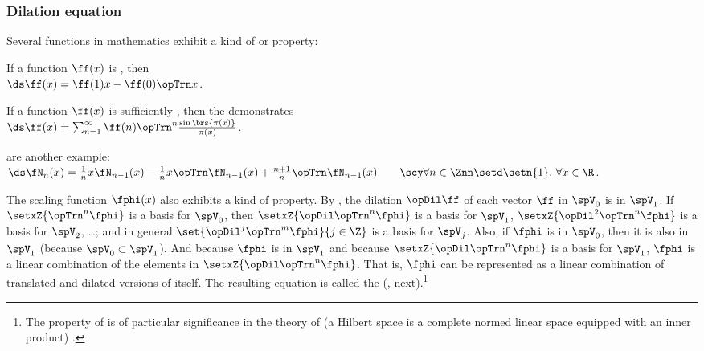 \subsubsection{Dilation equation}
Several functions in mathematics exhibit a kind of  or  property:
\begin{listi}
  \item If a function $\ff(x)$ is , then 
        \\\indentx$\ds\ff(x) = \ff(1)x - \ff(0)\opTrn x$.   %
  \item If a function $\ff(x)$ is sufficiently , then the   demonstrates
        \\\indentx$\ds\ff(x) = \sum_{n=1}^\infty \ff(n) \opTrn^n\frac{\sin\brs{\pi(x)}}{\pi(x)}$.
  \item {}  are another example:
        \\\indentx$\ds\fN_n(x)   = \frac{1}{n}x\fN_{n-1}(x) - \frac{1}{n}x\opTrn\fN_{n-1}(x) + \frac{n+1}{n}\opTrn\fN_{n-1}(x)  \qquad\scy\forall n\in\Znn\setd\setn{1},\,  \forall x\in\R$.
\end{listi}

The scaling function $\fphi(x)$  also exhibits a kind of  property.
By , the dilation $\opDil\ff$ of each vector $\ff$ in $\spV_0$ is in $\spV_1$.
If $\setxZ{\opTrn^n\fphi}$ is a basis for $\spV_0$,
then $\setxZ{\opDil\opTrn^n\fphi}$ is a basis for $\spV_1$,
$\setxZ{\opDil^2\opTrn^n\fphi}$ is a basis for $\spV_2$, \ldots;
and in general $\set{\opDil^j\opTrn^m\fphi}{j\in\Z}$ is a basis for $\spV_j$.
Also, if $\fphi$ is in $\spV_0$, then it is also in $\spV_1$ (because $\spV_0\subset\spV_1$).
And because $\fphi$ is in $\spV_1$ and because $\setxZ{\opDil\opTrn^n\fphi}$ is a basis for $\spV_1$,
$\fphi$ is a linear combination of the elements in $\setxZ{\opDil\opTrn^n\fphi}$.
That is, $\fphi$ can be represented as a linear combination of translated and dilated versions of itself.
The resulting equation is called the  (, next).\footnote{%
The property of  is of particular significance in the theory of 
 (a Hilbert space is a complete normed linear space equipped with an inner product)%
.
}

